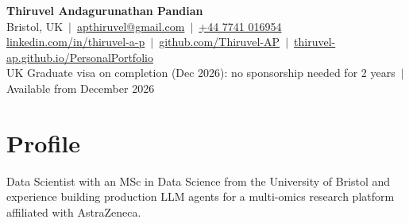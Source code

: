 \documentclass[a4paper,10pt]{article}
\begin{document}
\fontsize{10.5}{12.6}\selectfont

\begin{center}
  {\LARGE\bfseries Thiruvel Andagurunathan Pandian}\\[3pt]
  Bristol, UK \,$|$\, \href{mailto:apthiruvel@gmail.com}{apthiruvel@gmail.com} \,$|$\, \href{tel:+447741016954}{+44 7741 016954}\\[1pt]
\href{https://www.linkedin.com/in/thiruvel-a-p/}{linkedin.com/in/thiruvel-a-p} \,$|$\, \href{https://github.com/Thiruvel-AP}{github.com/Thiruvel-AP} \,$|$\, \href{https://thiruvel-ap.github.io/PersonalPortfolio/}{thiruvel-ap.github.io/PersonalPortfolio}\\[1pt]
  UK Graduate visa on completion (Dec 2026): no sponsorship needed for 2 years \,$|$\, Available from December 2026
\end{center}

\section{Profile}
Data Scientist with an MSc in Data Science from the University of Bristol and experience building production LLM agents for a multi-omics research platform affiliated with AstraZeneca.

\end{document}
